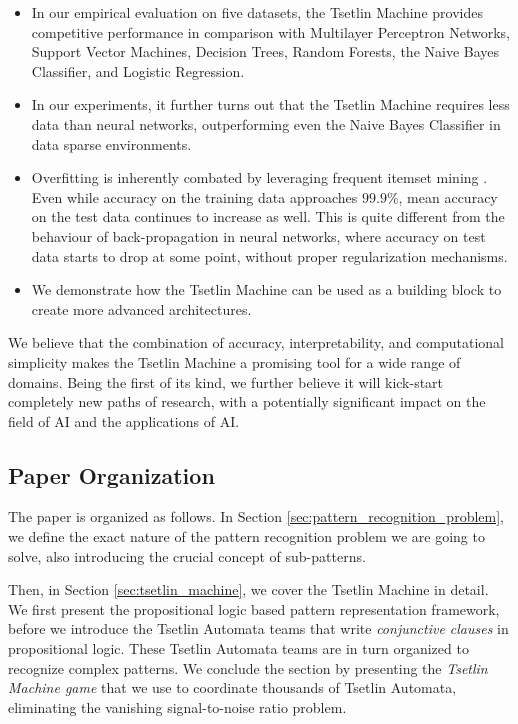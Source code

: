 \documentclass[11pt,a4paper]{article}
\begin{document}
\begin{itemize}
\item In our empirical evaluation on five datasets, the Tsetlin Machine provides competitive performance in comparison with Multilayer Perceptron Networks, Support Vector Machines, Decision Trees, Random Forests, the Naive Bayes Classifier, and Logistic Regression.
\item In our experiments, it further turns out that the Tsetlin Machine requires less data than neural networks, outperforming even the Naive Bayes Classifier in data sparse environments.
\item Overfitting is inherently combated by leveraging frequent itemset mining \cite{Haugland2014}. Even while accuracy on the training data approaches $99.9$\%, mean accuracy on the test data continues to increase as well. This is quite different from the behaviour of back-propagation in neural networks, where accuracy on test data starts to drop at some point, without proper regularization mechanisms.
\item We demonstrate how the Tsetlin Machine can be used as a building block to create more advanced architectures.
\end{itemize}
We believe that the combination of accuracy, interpretability, and computational simplicity makes the Tsetlin Machine a promising tool for a wide range of domains. Being the first of its kind, we further believe it will kick-start completely new paths of research, with a potentially significant impact on the field of AI and the applications of AI.

\subsection{Paper Organization}

The paper is organized as follows. In Section \ref{sec:pattern_recognition_problem}, we define the exact nature of the pattern recognition problem we are going to solve, also introducing the crucial concept of sub-patterns.

Then, in Section \ref{sec:tsetlin_machine}, we cover the Tsetlin Machine in detail. We first present the propositional logic based pattern representation framework, before we introduce the Tsetlin Automata teams that write \emph{conjunctive clauses} in propositional logic. These Tsetlin Automata teams are in turn organized to recognize complex patterns. We conclude the section by presenting the \emph{Tsetlin Machine game} that we use to coordinate thousands of Tsetlin Automata, eliminating the vanishing signal-to-noise ratio problem.
\end{document}
